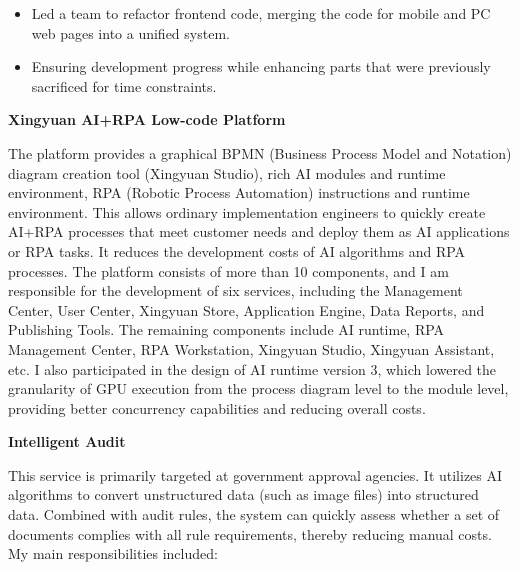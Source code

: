 \documentclass[a4paper]{article}
\newenvironment{changemargin}[2]{%
  \begin{list}{}{%
    \setlength{\topsep}{0pt}%
    \setlength{\leftmargin}{#1}%
    \setlength{\rightmargin}{#2}%
    \setlength{\listparindent}{\parindent}%
    \setlength{\itemindent}{\parindent}%
    \setlength{\parsep}{\parskip}%
  }%
  \item[]}{\end{list}
}
\newenvironment{body} {
	\vspace*{-16pt}
	\begin{changemargin}{-0.5in}{-0.5in}
  }
	{\end{changemargin}
}
\begin{document}
\begin{body}
	\vspace*{-8pt}
	\begin{itemize} \itemsep -0pt  %
		\item \begin{justify} 
			Led a team to refactor frontend code, merging the code for mobile and PC web pages into a unified system.
		\end{justify} 
	\end{itemize}

	\vspace*{-8pt}
	\begin{itemize} \itemsep -0pt  %
		\item \begin{justify} 
			Ensuring development progress while enhancing parts that were previously sacrificed for time constraints.
		\end{justify} 
	\end{itemize}
	
	\medskip

	\textbf{Xingyuan AI+RPA Low-code Platform} \\

	\begin{justify} 
		The platform provides a graphical BPMN (Business Process Model and Notation) diagram creation tool (Xingyuan Studio), rich AI modules and runtime environment, RPA (Robotic Process Automation) instructions and runtime environment. This allows ordinary implementation engineers to quickly create AI+RPA processes that meet customer needs and deploy them as AI applications or RPA tasks. It reduces the development costs of AI algorithms and RPA processes. The platform consists of more than 10 components, and I am responsible for the development of six services, including the Management Center, User Center, Xingyuan Store, Application Engine, Data Reports, and Publishing Tools. The remaining components include AI runtime, RPA Management Center, RPA Workstation, Xingyuan Studio, Xingyuan Assistant, etc. I also participated in the design of AI runtime version 3, which lowered the granularity of GPU execution from the process diagram level to the module level, providing better concurrency capabilities and reducing overall costs.
	\end{justify} 
	
	\medskip

	\textbf{Intelligent Audit} \\

	\begin{justify} 
	 	This service is primarily targeted at government approval agencies. It utilizes AI algorithms to convert unstructured data (such as image files) into structured data. Combined with audit rules, the system can quickly assess whether a set of documents complies with all rule requirements, thereby reducing manual costs. My main responsibilities included:
	\end{justify}
	\smallskip


\end{body}
\end{document}
